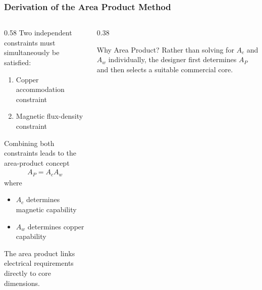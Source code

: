 \begin{frame} \frametitle{Derivation of the Area Product Method}
    \begin{columns} 
        \begin{column}{0.58\textwidth} 
            Two independent constraints must simultaneously be satisfied: \vspace{0.15cm} 
            \begin{enumerate} 
                \item Copper accommodation constraint 
                \item Magnetic flux-density constraint
            \end{enumerate} 
            Combining both constraints leads to the area-product concept 
            \begin{align} 
                A_P = A_cA_w 
            \end{align} where 
            \begin{itemize} 
                \item $A_c$ determines magnetic capability 
                \item $A_w$ determines copper capability
            \end{itemize} 
            \vspace{0.15cm} 
            The area product links electrical requirements directly to core dimensions. 
        \end{column} 
        \begin{column}{0.38\textwidth} 
            \begin{block}{Why Area Product?} Rather than solving for $A_c$ and $A_w$ individually, the designer first determines $A_P$ and then selects a suitable commercial core. 
            \end{block} 
        \end{column} 
    \end{columns} 
\end{frame} 
